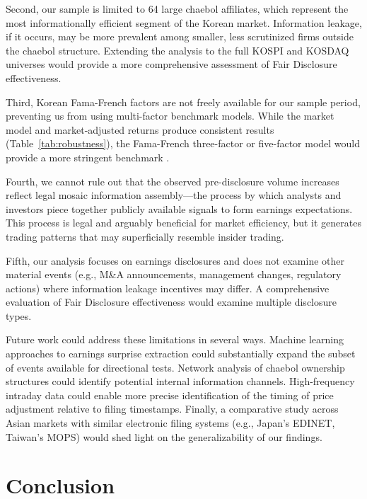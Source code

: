 \documentclass[manuscript,review]{acmart}
\begin{document}
Second, our sample is limited to 64 large chaebol affiliates, which represent the most informationally efficient segment of the Korean market. Information leakage, if it occurs, may be more prevalent among smaller, less scrutinized firms outside the chaebol structure. Extending the analysis to the full KOSPI and KOSDAQ universes would provide a more comprehensive assessment of Fair Disclosure effectiveness.

Third, Korean Fama-French factors are not freely available for our sample period, preventing us from using multi-factor benchmark models. While the market model and market-adjusted returns produce consistent results (Table~\ref{tab:robustness}), the Fama-French three-factor or five-factor model would provide a more stringent benchmark \cite{gu2020empirical}.

Fourth, we cannot rule out that the observed pre-disclosure volume increases reflect legal mosaic information assembly---the process by which analysts and investors piece together publicly available signals to form earnings expectations. This process is legal and arguably beneficial for market efficiency, but it generates trading patterns that may superficially resemble insider trading.

Fifth, our analysis focuses on earnings disclosures and does not examine other material events (e.g., M\&A announcements, management changes, regulatory actions) where information leakage incentives may differ. A comprehensive evaluation of Fair Disclosure effectiveness would examine multiple disclosure types.

Future work could address these limitations in several ways. Machine learning approaches to earnings surprise extraction could substantially expand the subset of events available for directional tests. Network analysis of chaebol ownership structures could identify potential internal information channels. High-frequency intraday data could enable more precise identification of the timing of price adjustment relative to filing timestamps. Finally, a comparative study across Asian markets with similar electronic filing systems (e.g., Japan's EDINET, Taiwan's MOPS) would shed light on the generalizability of our findings.

\section{Conclusion}
\end{document}

